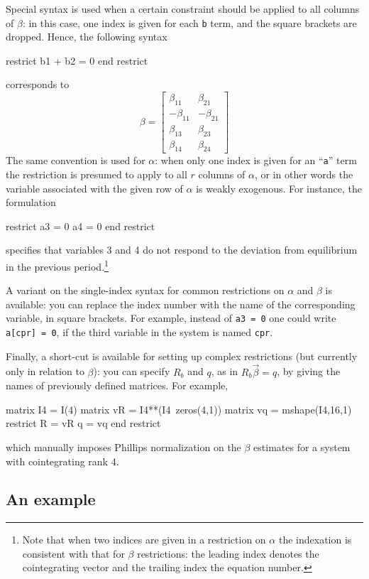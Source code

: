 Special syntax is used when a certain constraint should be applied to
all columns of $\beta$: in this case, one index is given for each
\texttt{b} term, and the square brackets are dropped.  Hence, the
following syntax
\begin{code}
restrict
  b1 + b2 = 0
end restrict
\end{code}
corresponds to
\[
\beta = \left[
\begin{array}{rr}
\beta_{11} & \beta_{21} \\
-\beta_{11} & -\beta_{21} \\
\beta_{13} & \beta_{23} \\
\beta_{14} & \beta_{24}
\end{array}
\right]
\]
The same convention is used for $\alpha$: when only one index is given
for an ``\texttt{a}'' term the restriction is presumed to apply to all
$r$ columns of $\alpha$, or in other words the variable associated
with the given row of $\alpha$ is weakly exogenous. For instance, the
formulation
%
\begin{code}
restrict
  a3 = 0
  a4 = 0
end restrict
\end{code}
%
specifies that variables 3 and 4 do not respond to the deviation from
equilibrium in the previous period.\footnote{Note that when two
  indices are given in a restriction on $\alpha$ the indexation is
  consistent with that for $\beta$ restrictions: the leading index
  denotes the cointegrating vector and the trailing index the equation
  number.} 

A variant on the single-index syntax for common restrictions on
$\alpha$ and $\beta$ is available: you can replace the index number
with the name of the corresponding variable, in square brackets. For
example, instead of \texttt{a3 = 0} one could write \texttt{a[cpr] =
  0}, if the third variable in the system is named \texttt{cpr}.

Finally, a short-cut is available for setting up complex restrictions (but
currently only in relation to $\beta$): you can specify $R_b$ and $q$,
as in $R_b \vec{\beta} = q$, by giving the names of previously
defined matrices.  For example,
%
\begin{code}
matrix I4 = I(4)
matrix vR = I4**(I4~zeros(4,1))
matrix vq = mshape(I4,16,1)
restrict
  R = vR
  q = vq
end restrict
\end{code}
%
which manually imposes Phillips normalization on the $\beta$ estimates
for a system with cointegrating rank 4.
 
\subsection{An example}
\label{sec:vecm-overid-ex}

